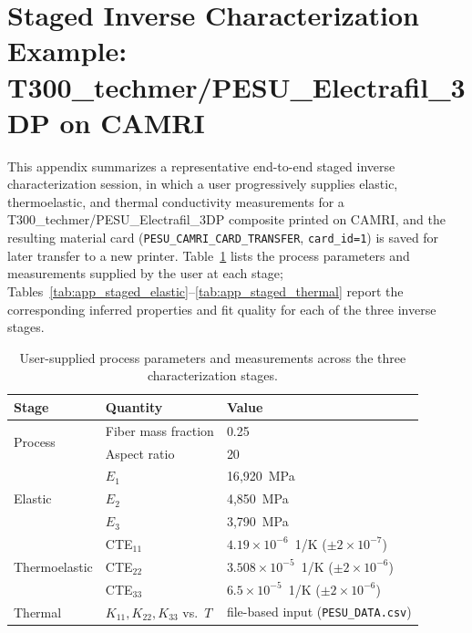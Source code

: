 \documentclass[preprint,review,10pt,number]{elsarticle}
\begin{document}
\section{Staged Inverse Characterization Example: T300\_techmer/PESU\_Electrafil\_3DP on CAMRI}
\label{app:staged_characterization}

This appendix summarizes a representative end-to-end staged inverse characterization session, in which a user progressively supplies elastic, thermoelastic, and thermal conductivity measurements for a T300\_techmer/PESU\_Electrafil\_3DP composite printed on CAMRI, and the resulting material card (\texttt{PESU\_CAMRI\_CARD\_TRANSFER}, \texttt{card\_id=1}) is saved for later transfer to a new printer. Table~\ref{tab:app_staged_inputs} lists the process parameters and measurements supplied by the user at each stage; Tables~\ref{tab:app_staged_elastic}--\ref{tab:app_staged_thermal} report the corresponding inferred properties and fit quality for each of the three inverse stages.

\begin{table}[h]
\centering
\caption{User-supplied process parameters and measurements across the three characterization stages.}
\label{tab:app_staged_inputs}
\begin{tabular}{lll}
\toprule
\textbf{Stage} & \textbf{Quantity} & \textbf{Value} \\
\midrule
\multirow{2}{*}{Process}
 & Fiber mass fraction & 0.25 \\
 & Aspect ratio & 20 \\
\midrule
\multirow{3}{*}{Elastic}
 & $E_1$ & 16{,}920~MPa \\
 & $E_2$ & 4{,}850~MPa \\
 & $E_3$ & 3{,}790~MPa \\
\midrule
\multirow{3}{*}{Thermoelastic}
 & CTE$_{11}$ & $4.19\times10^{-6}$~1/K ($\pm 2\times10^{-7}$) \\
 & CTE$_{22}$ & $3.508\times10^{-5}$~1/K ($\pm 2\times10^{-6}$) \\
 & CTE$_{33}$ & $6.5\times10^{-5}$~1/K ($\pm 2\times10^{-6}$) \\
\midrule
Thermal & $K_{11}, K_{22}, K_{33}$ vs.\ $T$ & file-based input (\texttt{PESU\_DATA.csv}) \\
\bottomrule
\end{tabular}
\end{table}
\end{document}
